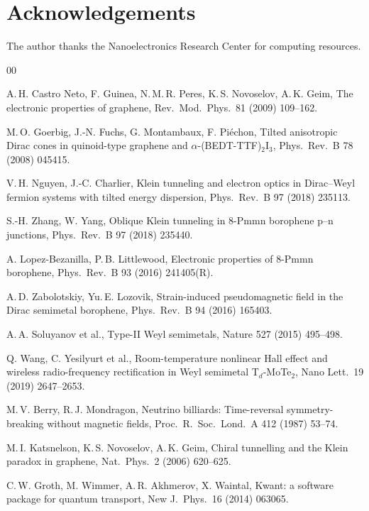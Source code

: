 \documentclass[preprint, 12pt, a4paper]{elsarticle}
\begin{document}
\section*{Acknowledgements}
The author thanks the Nanoelectronics Research Center for computing
resources.

\begin{thebibliography}{00}

A.\,H. Castro Neto, F. Guinea, N.\,M.\,R. Peres, K.\,S. Novoselov,
A.\,K. Geim, The electronic properties of graphene, Rev.\ Mod.\
Phys.\ 81 (2009) 109--162.

M.\,O. Goerbig, J.-N. Fuchs, G. Montambaux, F. Pi\'echon, Tilted
anisotropic Dirac cones in quinoid-type graphene and
$\alpha$-(BEDT-TTF)$_2$I$_3$, Phys.\ Rev.\ B 78 (2008) 045415.

V.\,H. Nguyen, J.-C. Charlier, Klein tunneling and electron optics
in Dirac--Weyl fermion systems with tilted energy dispersion, Phys.\
Rev.\ B 97 (2018) 235113.

S.-H. Zhang, W. Yang, Oblique Klein tunneling in 8-Pmmn borophene
p--n junctions, Phys.\ Rev.\ B 97 (2018) 235440.

A. Lopez-Bezanilla, P.\,B. Littlewood, Electronic properties of
8-Pmmn borophene, Phys.\ Rev.\ B 93 (2016) 241405(R).

A.\,D. Zabolotskiy, Yu.\,E. Lozovik, Strain-induced pseudomagnetic
field in the Dirac semimetal borophene, Phys.\ Rev.\ B 94 (2016)
165403.

A.\,A. Soluyanov et al., Type-II Weyl semimetals, Nature 527 (2015)
495--498.

Q. Wang, C. Yesilyurt et al., Room-temperature nonlinear Hall effect
and wireless radio-frequency rectification in Weyl semimetal
T$_d$-MoTe$_2$, Nano Lett.\ 19 (2019) 2647--2653.

M.\,V. Berry, R.\,J. Mondragon, Neutrino billiards: Time-reversal
symmetry-breaking without magnetic fields, Proc.\ R.\ Soc.\ Lond.\ A
412 (1987) 53--74.

M.\,I. Katsnelson, K.\,S. Novoselov, A.\,K. Geim, Chiral tunnelling
and the Klein paradox in graphene, Nat.\ Phys.\ 2 (2006) 620--625.

\bibitem{Groth2014}
C.\,W. Groth, M. Wimmer, A.\,R. Akhmerov, X. Waintal, Kwant: a
software package for quantum transport, New J.\ Phys.\ 16 (2014)
063065.


\end{thebibliography}
\end{document}
